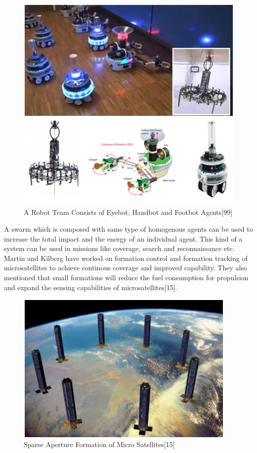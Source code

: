 \begin{figure}[H]
\caption{A Robot Team Consists of Eyebot, Handbot and Footbot Agents[99]}
\centering
\includegraphics[scale = 1]{eyebot}
\end{figure} 

A swarm which is composed with same type of homogenous agents can be used to increase the total impact and the energy of an individual agent. This kind of a system can be used in missions like coverage, search and  reconnaissance etc.  Martin and Kilberg have worked on formation control and formation tracking of  microsatellites to achieve continous coverage and improved capability. They also mentioned that small formations will reduce the fuel consumption for propulsion and expand the sensing capabilities of microsatellites[15].

\begin{figure}[H]
\caption{Sparse Aperture Formation of Micro Satellites[15]}
\centering
\includegraphics[scale = 1]{Satellite}
\end{figure} 


